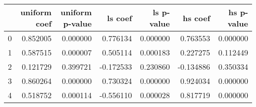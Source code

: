 \begin{tabular}{lrrrrrr}
\toprule
 & uniform coef & uniform p-value & ls coef & ls p-value & hs coef & hs p-value \\
\midrule
0 & 0.852005 & 0.000000 & 0.776134 & 0.000000 & 0.763553 & 0.000000 \\
1 & 0.587515 & 0.000007 & 0.505114 & 0.000183 & 0.227275 & 0.112449 \\
2 & 0.121729 & 0.399721 & -0.172533 & 0.230860 & -0.134886 & 0.350334 \\
3 & 0.860264 & 0.000000 & 0.730324 & 0.000000 & 0.924034 & 0.000000 \\
4 & 0.518752 & 0.000114 & -0.556110 & 0.000028 & 0.817719 & 0.000000 \\
\bottomrule
\end{tabular}
